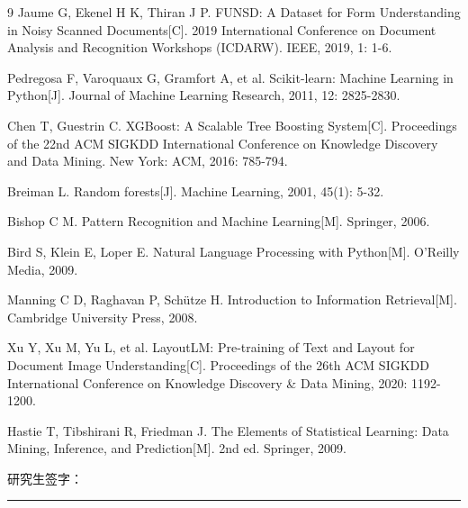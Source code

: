 \documentclass[12pt,a4paper]{article}
\begin{document}
\begin{thebibliography}{9}
     Jaume G, Ekenel H K, Thiran J P. FUNSD: A Dataset for Form Understanding in Noisy Scanned Documents[C]. 2019 International Conference on Document Analysis and Recognition Workshops (ICDARW). IEEE, 2019, 1: 1-6.

     Pedregosa F, Varoquaux G, Gramfort A, et al. Scikit-learn: Machine Learning in Python[J]. Journal of Machine Learning Research, 2011, 12: 2825-2830.

     Chen T, Guestrin C. XGBoost: A Scalable Tree Boosting System[C]. Proceedings of the 22nd ACM SIGKDD International Conference on Knowledge Discovery and Data Mining. New York: ACM, 2016: 785-794.

     Breiman L. Random forests[J]. Machine Learning, 2001, 45(1): 5-32.

     Bishop C M. Pattern Recognition and Machine Learning[M]. Springer, 2006.

     Bird S, Klein E, Loper E. Natural Language Processing with Python[M]. O'Reilly Media, 2009.

     Manning C D, Raghavan P, Schütze H. Introduction to Information Retrieval[M]. Cambridge University Press, 2008.

     Xu Y, Xu M, Yu L, et al. LayoutLM: Pre-training of Text and Layout for Document Image Understanding[C]. Proceedings of the 26th ACM SIGKDD International Conference on Knowledge Discovery \& Data Mining, 2020: 1192-1200.

     Hastie T, Tibshirani R, Friedman J. The Elements of Statistical Learning: Data Mining, Inference, and Prediction[M]. 2nd ed. Springer, 2009.
\end{thebibliography}

\vspace{3cm}

\noindent 研究生签字：\rule{5cm}{0.4pt}

\vspace{1cm}
\end{document}
